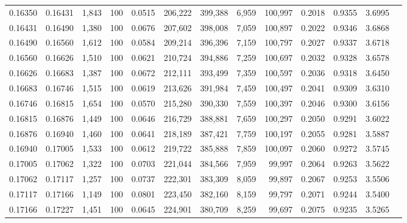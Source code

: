 \begin{tabular}{rrrrrrrrrrrrr}
0.16350 & 0.16431 & 1,843 & 100 &                                     0.0515 & 206,222 & 399,388 &   6,959 & 100,997 & 0.2018 & 0.9355 & 3.6995 \\
0.16431 & 0.16490 & 1,380 & 100 &                                     0.0676 & 207,602 & 398,008 &   7,059 & 100,897 & 0.2022 & 0.9346 & 3.6868 \\
0.16490 & 0.16560 & 1,612 & 100 &                                     0.0584 & 209,214 & 396,396 &   7,159 & 100,797 & 0.2027 & 0.9337 & 3.6718 \\
0.16560 & 0.16626 & 1,510 & 100 &                                     0.0621 & 210,724 & 394,886 &   7,259 & 100,697 & 0.2032 & 0.9328 & 3.6578 \\
0.16626 & 0.16683 & 1,387 & 100 &                                     0.0672 & 212,111 & 393,499 &   7,359 & 100,597 & 0.2036 & 0.9318 & 3.6450 \\
0.16683 & 0.16746 & 1,515 & 100 &                                     0.0619 & 213,626 & 391,984 &   7,459 & 100,497 & 0.2041 & 0.9309 & 3.6310 \\
0.16746 & 0.16815 & 1,654 & 100 &                                     0.0570 & 215,280 & 390,330 &   7,559 & 100,397 & 0.2046 & 0.9300 & 3.6156 \\
0.16815 & 0.16876 & 1,449 & 100 &                                     0.0646 & 216,729 & 388,881 &   7,659 & 100,297 & 0.2050 & 0.9291 & 3.6022 \\
0.16876 & 0.16940 & 1,460 & 100 &                                     0.0641 & 218,189 & 387,421 &   7,759 & 100,197 & 0.2055 & 0.9281 & 3.5887 \\
0.16940 & 0.17005 & 1,533 & 100 &                                     0.0612 & 219,722 & 385,888 &   7,859 & 100,097 & 0.2060 & 0.9272 & 3.5745 \\
0.17005 & 0.17062 & 1,322 & 100 &                                     0.0703 & 221,044 & 384,566 &   7,959 &  99,997 & 0.2064 & 0.9263 & 3.5622 \\
0.17062 & 0.17117 & 1,257 & 100 &                                     0.0737 & 222,301 & 383,309 &   8,059 &  99,897 & 0.2067 & 0.9253 & 3.5506 \\
0.17117 & 0.17166 & 1,149 & 100 &                                     0.0801 & 223,450 & 382,160 &   8,159 &  99,797 & 0.2071 & 0.9244 & 3.5400 \\
0.17166 & 0.17227 & 1,451 & 100 &                                     0.0645 & 224,901 & 380,709 &   8,259 &  99,697 & 0.2075 & 0.9235 & 3.5265 \\

\end{tabular}
